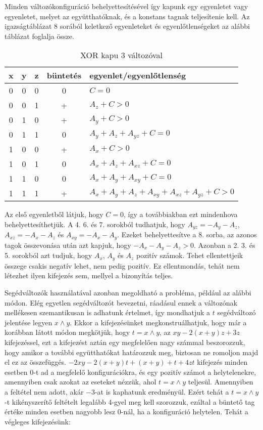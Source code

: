 Minden változókonfiguráció behelyettesítésével így kapunk egy egyenletet vagy egyenletet, melyet az együtthatóknak, és a konstans tagnak teljesítenie kell. Az igazságtáblázat 8 sorából keletkező egyenleteket és egyenlőtlenségeket az alábbi táblázat foglalja össze.

\begin{table}[ht]
	\footnotesize
	\centering
	\begin{tabular}{ c c c c l }
		\toprule
		x & y & z & büntetés & egyenlet/egyenlőtlenség \\
		\midrule
		0 & 0 & 0 & 0 & $C=0$   \\
		0 & 0 & 1 & + & $A_{z}+C>0$ \\
		0 & 1 & 0 & + & $A_{y}+C>0$ \\
		0 & 1 & 1 & 0 & $A_{y}+A_{z}+A_{yz}+C=0$   \\
		1 & 0 & 0 & + & $A_{x}+C>0$ \\
		1 & 0 & 1 & 0 & $A_{x}+A_{z}+A_{xz}+C=0$   \\
		1 & 1 & 0 & 0 & $A_{x}+A_{y}+A_{xy}+C=0$   \\
		1 & 1 & 1 & + & $A_{x}+A_{y}+A_{z}+A_{xy}+A_{xz}+A_{yz}+C>0$ \\			
		\bottomrule
	\end{tabular}
	\caption{XOR kapu 3 változóval}
	\label{tab:XORgate3var}
\end{table}

Az első egyenletből látjuk, hogy $C=0$, így a továbbiakban ezt mindenhova behelyettesíthetjük. A 4. 6. és 7. sorokból tudhatjuk, hogy $A_{yz}=-A_y-A_z$, $A_{xz}=-A_x-A_z$ és $A_{xy}=-A_x-A_y$. Ezeket behelyettesítve a 8. sorba, az azonos tagok összevonása után azt kapjuk, hogy $-A_x-A_y-A_z>0$.
Azonban a 2. 3. és 5. sorokból azt tudjuk, hogy $A_x$, $A_y$ és $A_z$ pozitív számok. Tehet ellentettjeik összege csakis negatív lehet, nem pedig pozitív. Ez ellentmondás, tehát nem létezhet ilyen kifejezés sem, mellyel a bizonyítás teljes.

Segédváltozók használatával azonban megoldható a probléma, például az alábbi módon. Elég egyetlen segédváltozót bevezetni, ráadásul ennek a változónak mellékesen szemantikusan is adhatunk értelmet, így mondhatjuk a $t$ segédváltozó jelentése legyen $x \wedge y$.
Ekkor a kifejezésünket megkonstruálhatjuk, hogy már a korábban látott módon megkötjük, hogy $t = x \wedge y$, az $xy-2(x+y)z+3z$ kifejezéssel, ezt a kifejezést aztán egy megfelelően nagy számmal beszorozzuk, hogy amikor a további együtthatókat határozzuk meg, biztosan ne romoljon majd el ez az összefüggés. $-2xy-2(x+y)t+(x+y)+t+4zt$ kifejezés minden esetben $0$-t ad a megfelelő konfigurációkra, és egy pozitív számot a helytelenekre, amennyiben csak azokat az eseteket nézzük, ahol $t = x \wedge  y$ teljesül. Amennyiben a feltétel nem adott, akár $-3$-at is kaphatunk eredményül. Ezért tehát a $t = x \wedge  y$-t kikényszerítő feltételt legalább 4-gyel meg kell szorozzuk, ezáltal a büntető tag értéke minden esetben nagyobb lesz $0$-nál, ha a konfiguráció helytelen. Tehát a végleges kifejezésünk:



